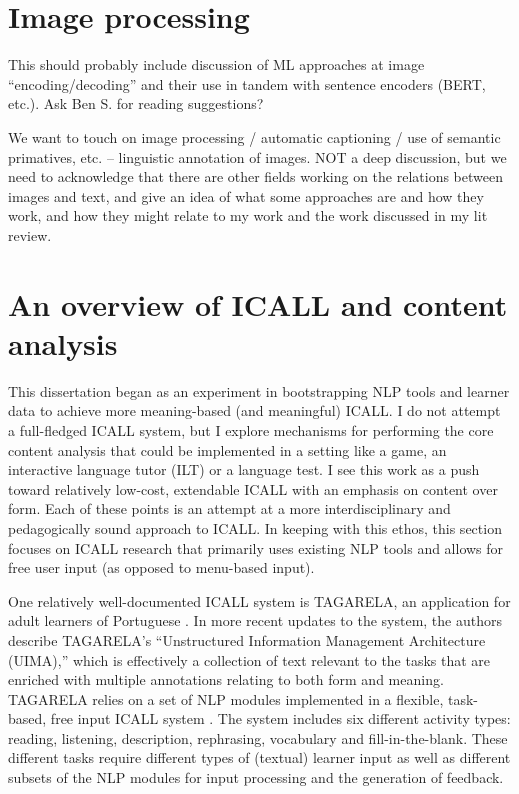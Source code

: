 \section{Image processing}
\label{section:imageProcessing}
This should probably include discussion of ML approaches at image ``encoding/decoding'' and their use in tandem with sentence encoders (BERT, etc.). Ask Ben S. for reading suggestions?

We want to touch on image processing / automatic captioning / use of semantic primatives, etc. -- linguistic annotation of images. NOT a deep discussion, but we need to acknowledge that there are other fields working on the relations between images and text, and give an idea of what some approaches are and how they work, and how they might relate to my work and the work discussed in my lit review.

\section{An overview of ICALL and content analysis}
\label{section:ICALLoverview}
This dissertation began as an experiment in bootstrapping NLP tools and learner data to achieve more meaning-based (and meaningful) ICALL. I do not attempt a full-fledged ICALL system, but I explore mechanisms for performing the core content analysis that could be implemented in a setting like a game, an interactive language tutor (ILT) or a language test. I see this work as a push toward relatively low-cost, extendable ICALL with an emphasis on content over form. Each of these points is an attempt at a more interdisciplinary and pedagogically sound approach to ICALL. In keeping with this ethos, this section focuses on ICALL research that primarily uses existing NLP tools and allows for free user input (as opposed to menu-based input).

One relatively well-documented ICALL system is TAGARELA, an application for adult learners of Portuguese \cite{amaral2007designing,amaral:meurers:user:07}. In more recent updates to the system, the authors describe TAGARELA's ``Unstructured Information Management Architecture (UIMA),'' which is effectively a collection of text relevant to the tasks that are enriched with multiple annotations relating to both form and meaning. TAGARELA relies on a set of NLP modules implemented in a flexible, task-based, free input ICALL system \cite{Amaral.Meurers.Ziai-11}. The system includes six different activity types: reading, listening, description, rephrasing, vocabulary and fill-in-the-blank. These different tasks require different types of (textual) learner input as well as different subsets of the NLP modules for input processing and the generation of feedback.

